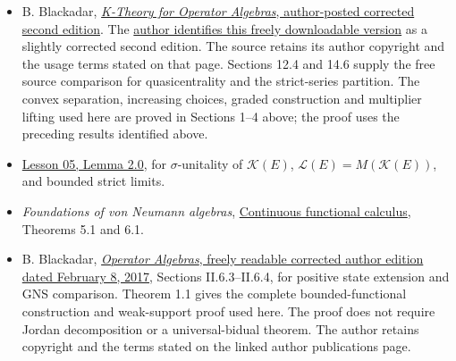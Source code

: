 \documentclass[
  11pt,
]{article}
\begin{document}
\begin{itemize}
\item
  B. Blackadar,
  \href{https://www.bruceblackadar.com/Mathematics/book6.pdf}{\emph{K-Theory
  for Operator Algebras}, author-posted corrected second edition}. The
  \href{https://www.bruceblackadar.com/mathpubs.html}{author identifies
  this freely downloadable version} as a slightly corrected second
  edition. The source retains its author copyright and the usage terms
  stated on that page. Sections 12.4 and 14.6 supply the free source
  comparison for quasicentrality and the strict-series partition. The
  convex separation, increasing choices, graded construction and
  multiplier lifting used here are proved in Sections 1--4 above; the
  proof uses the preceding results identified above.
\item
  \href{KT-KK-05.html\#lemma-2-0-compact-module-operators-and-their-multipliers}{Lesson
  05, Lemma 2.0}, for \(\sigma\)-unitality of \(\mathcal K(E)\),
  \(\mathcal L(E)=M(\mathcal K(E))\), and bounded strict limits.
\item
  \emph{Foundations of von Neumann algebras},
  \href{https://kokunoyumeto.github.io/open-math-courses/courses/foundations-of-von-neumann-algebras/c-star-algebras-continuous-functional-calculus-automatic-continuity-positive-cones.html}{Continuous
  functional calculus}, Theorems 5.1 and 6.1.
\item
  B. Blackadar,
  \href{https://www.bruceblackadar.com/Mathematics/Cycr.pdf}{\emph{Operator
  Algebras}, freely readable corrected author edition dated February 8,
  2017}, Sections II.6.3--II.6.4, for positive state extension and GNS
  comparison. Theorem 1.1 gives the complete bounded-functional
  construction and weak-support proof used here. The proof does not
  require Jordan decomposition or a universal-bidual theorem. The author
  retains copyright and the terms stated on the linked author
  publications page.
\end{itemize}
\end{document}
